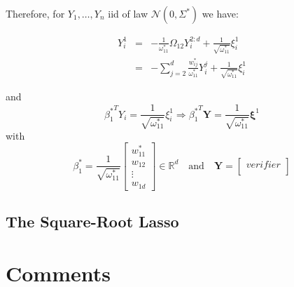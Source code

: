 \documentclass[a4paper,12pt]{article}
\let\bb\mathbb       %
\def\RR{{\bb R}}\def\ZZ{{\bb Z}}\def\FF{{\bb F}}\def\DD{{\bb D}}
\def\bb{\mathbb}
\def\bY{\boldsymbol Y}
\def\bxi{\boldsymbol \xi}
\begin{document}
Therefore, for $Y_1,\dots,Y_n$ iid of law $\mathcal N(0,\Sigma^*)$ we have:

\begin{equation}
\begin{array}{lcl}
  Y_i^1&=&-\frac{1}{\omega_{11}^*}\Omega_{12}Y_i^{2:d}+\frac{1}{\sqrt{\omega_{11}^*}}\xi^1_i\\
  &=&-\sum_{j=2}^{d}\frac{w_{ij}^*}{\omega_{11}^*}Y_i^j+\frac{1}{\sqrt{\omega_{11}^*}}\xi^1_i
\end{array}
\end{equation}

and
\begin{equation}
{\beta_1^*}^TY_i=\frac{1}{\sqrt{\omega_{11}^*}}\xi^1_i
\Rightarrow
{\beta_1^*}^T\bY=\frac{1}{\sqrt{\omega_{11}^*}}\bxi^1
\end{equation}
with
\begin{equation}
\beta_1^*=\frac{1}{\sqrt{\omega_{11}^*}}
  \begin{bmatrix}
  w_{11}^*\\
  w_{12}\\
  \vdots\\
  w_{1d}
  \end{bmatrix}
  \in \RR^d
  \quad \text{and}\quad \bY= \begin{bmatrix}
  verifier\\
  \end{bmatrix}
\end{equation}


\subsection{The Square-Root Lasso}

\section{Comments}


\end{document}

